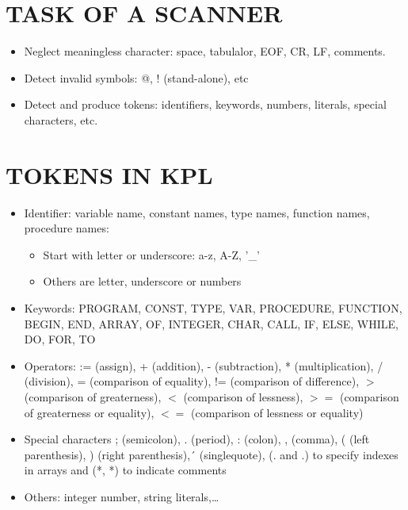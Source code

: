 \documentclass[12pt, a4paper]{report}
\begin{document}
		\section{TASK OF A SCANNER}
			\begin{itemize}
				\item Neglect meaningless character: space, tabulalor, EOF, CR, LF, comments.
				\item Detect invalid symbols: @, ! (stand-alone), etc
				\item Detect and produce tokens: identifiers, keywords, numbers, literals, special characters, etc.
			\end{itemize}
		\section{TOKENS IN KPL}
			\begin{itemize}
				\item Identifier: variable name, constant names, type names, function names, procedure names:
				\begin{itemize}
					\item Start with letter or underscore: a-z, A-Z, '\_'
    				\item Others are letter, underscore or numbers
				\end{itemize}
				\item Keywords: PROGRAM, CONST, TYPE, VAR, PROCEDURE, FUNCTION, BEGIN, END, ARRAY, OF, INTEGER, CHAR, CALL, IF, ELSE, WHILE, DO, FOR, TO
				\item Operators: := (assign), + (addition), - (subtraction), * (multiplication), / (division), = (comparison of equality), != (comparison of difference), $>$ (comparison of greaterness), $<$ (comparison of lessness), $>=$ (comparison of greaterness or equality), $<=$ (comparison of lessness or equality)
				\item Special characters ; (semicolon), . (period), : (colon), , (comma), ( (left parenthesis), ) (right parenthesis), \' \, (singlequote), (. and .) to specify indexes in arrays and (*, *) to indicate comments
				\item Others: integer number, string literals,\ldots
			\end{itemize}
\end{document}
